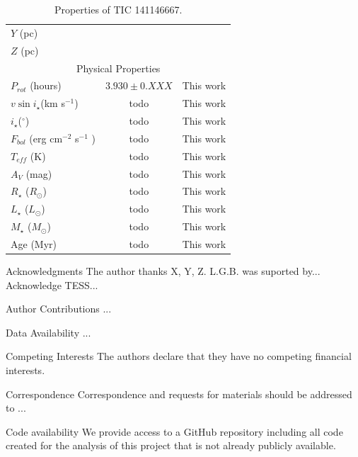 \documentclass{nature3}
\newcommand{\starname}{TIC 141146667}
\begin{document}
\begin{methods}
\begin{table}
\begin{tabular}{lcr}
    $Y$ (pc)  & & \\
    $Z$ (pc) & & \\
    \hline
    \multicolumn{3}{c}{Physical Properties} \\
    \hline
    $P_{rot}$ (hours) & $3.930 \pm 0.XXX$ & This work \\ 
    $v \sin i_\star$(km s$^{-1}$) & todo & This work\\
    $i_\star$($^\circ$) & todo & This work \\
    $F_{bol}$ (erg cm$^{-2}$ s$^{-1}$ ) & todo & This work\\
    $T_{eff}$ (K) & todo & This work\\
    $A_V$ (mag) & todo & This work \\
    $R_\star$ ($R_{\odot}$) & todo & This work\\
    $L_\star$ ($L_{\odot}$)  & todo & This work\\
    $M_\star$ ($M_{\odot}$)  & todo & This work\\
    Age (Myr) & todo &  This work \\
    \hline
    \end{tabular}
    \caption{Properties of \starname.}
    \label{tab:stellarParameters}
\end{table}


\end{methods}

   


\begin{addendum}

\item[Acknowledgments] The author thanks X, Y, Z.
  L.G.B. was suported by...
	Acknowledge TESS...


\item[Author Contributions] ...

\item[Data Availability] ...

\item[Competing Interests] The authors declare that they have no competing
financial interests.
 
\item[Correspondence] Correspondence and requests for materials should be
addressed to ...
 
\item[Code availability] We provide access to a GitHub repository including all
code created for the analysis of this project that is not already publicly
available.

\end{addendum}
\end{document}
